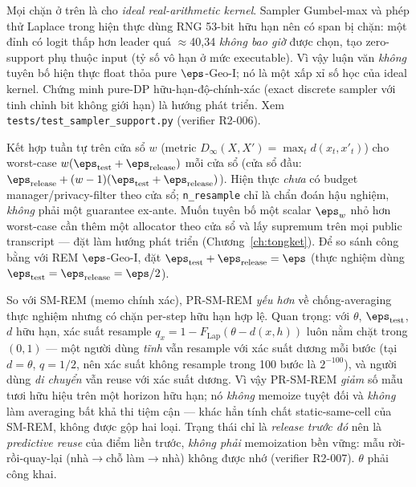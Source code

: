 \begin{nhanxet}
\label{rmk:finiteprec}
Mọi chặn ở trên là cho \emph{ideal real-arithmetic kernel}. Sampler Gumbel-max và
phép thử Laplace trong hiện thực dùng RNG 53-bit hữu hạn nên có span bị chặn: một
đỉnh có logit thấp hơn leader quá $\approx$40,34 \emph{không bao giờ} được chọn,
tạo zero-support phụ thuộc input (tỷ số vô hạn ở mức executable). Vì vậy luận văn
\emph{không} tuyên bố hiện thực float thỏa pure $\eps$-Geo-I; nó là một xấp xỉ số
học của ideal kernel. Chứng minh pure-DP hữu-hạn-độ-chính-xác (exact discrete
sampler với tinh chỉnh bit không giới hạn) là hướng phát triển. Xem
\texttt{tests/test\_sampler\_support.py} (verifier R2-006).
\end{nhanxet}

\begin{nhanxet}
\label{rmk:wevent}
Kết hợp tuần tự trên cửa sổ $w$ (metric $D_\infty(X,X')=\max_t d(x_t,x'_t)$) cho
worst-case $w(\eps_{\text{test}}+\eps_{\text{release}})$ mỗi cửa sổ (cửa sổ đầu:
$\eps_{\text{release}}+(w-1)(\eps_{\text{test}}+\eps_{\text{release}})$). Hiện
thực \emph{chưa} có budget manager/privacy-filter theo cửa sổ; \texttt{n\_resample}
chỉ là chẩn đoán hậu nghiệm, \emph{không} phải một guarantee ex-ante. Muốn tuyên
bố một scalar $\eps_w$ nhỏ hơn worst-case cần thêm một allocator theo cửa sổ và
lấy supremum trên mọi public transcript --- đặt làm hướng phát triển
(Chương~\ref{ch:tongket}). Để so sánh công bằng với REM $\eps$-Geo-I, đặt
$\eps_{\text{test}}+\eps_{\text{release}}=\eps$ (thực nghiệm dùng
$\eps_{\text{test}}=\eps_{\text{release}}=\eps/2$).
\end{nhanxet}

\begin{nhanxet}
So với SM-REM (memo chính xác), PR-SM-REM \emph{yếu hơn} về chống-averaging thực
nghiệm nhưng có chặn per-step hữu hạn hợp lệ. Quan trọng: với $\theta$,
$\eps_{\text{test}}$, $d$ hữu hạn, xác suất resample
$q_x=1-F_{\mathrm{Lap}}(\theta-d(x,h))$ luôn nằm chặt trong $(0,1)$ --- một người
dùng \emph{tĩnh} vẫn resample với xác suất dương mỗi bước (tại $d{=}\theta$,
$q{=}1/2$, nên xác suất không resample trong 100 bước là $2^{-100}$), và người
dùng \emph{di chuyển} vẫn reuse với xác suất dương. Vì vậy PR-SM-REM \emph{giảm}
số mẫu tươi hữu hiệu trên một horizon hữu hạn; nó \emph{không} memoize tuyệt đối
và \emph{không} làm averaging bất khả thi tiệm cận --- khác hẳn tính chất
static-same-cell của SM-REM, không được gộp hai loại. Trạng thái chỉ là
\emph{release trước đó} nên là \emph{predictive reuse} của điểm liền trước,
\emph{không phải} memoization bền vững: mẫu rời-rồi-quay-lại (nhà$\to$chỗ
làm$\to$nhà) không được nhớ (verifier R2-007). $\theta$ phải công khai.
\end{nhanxet}

